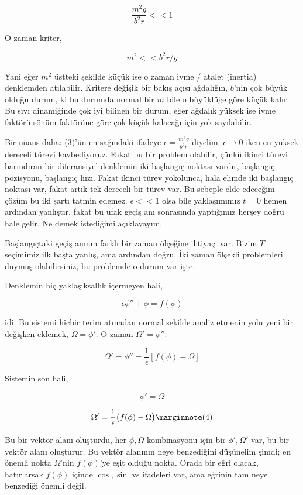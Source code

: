 \documentclass[12pt,fleqn]{article}\usepackage{../../common}
\begin{document}
$$ \frac{m^2g}{b^2r} << 1 $$

O zaman kriter,

$$ m^2 << b^2r / g  $$

Yani eğer $m^2$ üstteki şekilde küçük ise o zaman ivme / atalet (inertia)
denklemden atılabilir. Kritere değişik bir bakış açısı ağdalığın, $b$'nin çok
büyük olduğu durum, ki bu durumda normal bir $m$ bile o büyüklüğe göre küçük
kalır. Bu sıvı dinamiğinde çok iyi bilinen bir durum, eğer ağdalık yüksek ise
ivme faktörü sönüm faktörüne göre çok küçük kalacağı için yok sayılabilir.

Bir nüans daha: (3)'ün en sağındaki ifadeye $\epsilon = \frac{m^2g}{b^2r}$
diyelim. $\epsilon \to 0$ iken en yüksek dereceli türevi kaybediyoruz. Fakat bu
bir problem olabilir, çünkü ikinci türevi barındıran bir diferansiyel denklemin
iki başlangıç noktası vardır, başlangıç pozisyonu, başlangıç hızı. Fakat ikinci
türev yokolunca, hala elimde iki başlangıç noktası var, fakat artık tek dereceli
bir türev var. Bu sebeple elde edeceğim çözüm bu iki şartı tatmin
edemez. $\epsilon << 1$ olsa bile yaklaşımımız $t=0$ hemen ardından yanlıştır,
fakat bu ufak geçiş anı sonrasında yaptığımız herşey doğru hale gelir. Ne demek
istediğimi açıklayayım.

Başlangıçtaki geçiş anının farklı bir zaman ölçeğine ihtiyaçı var. Bizim $T$
seçimimiz ilk başta yanlış, ama ardından doğru. İki zaman ölçekli problemleri
duymuş olabilirsiniz, bu problemde o durum var işte.

Denklemin hiç yaklaşıksallık içermeyen hali,

$$ \epsilon \phi'' + \phi = f(\phi) $$

idi. Bu sistemi hicbir terim atmadan normal sekilde analiz etmenin yolu yeni bir
değişken eklemek, $\Omega = \phi'$. O zaman $\Omega' = \phi''$. 

$$ \Omega' = \phi'' = \frac{1}{\epsilon} [ f(\phi) - \Omega ] $$

Sistemin son hali,

$$ \phi' = \Omega $$

$$ 
\Omega'  = \frac{1}{\epsilon} \big( f(\phi) - \Omega \big) 
\mlabel{4}
$$

Bu bir vektör alanı oluşturdu, her $\phi,\Omega$ kombinasyonu için bir
$\phi',\Omega'$ var, bu bir vektör alanı oluşturur. Bu vektör alanının neye
benzediğini düşünelim şimdi; en önemli nokta $\Omega$'nin $f(\phi)$'ye eşit
olduğu nokta. Orada bir eğri olacak, hatırlarsak $f(\phi)$ içinde $\cos,\sin$ vs
ifadeleri var, ama eğrinin tam neye benzediği önemli değil. 
\end{document}
